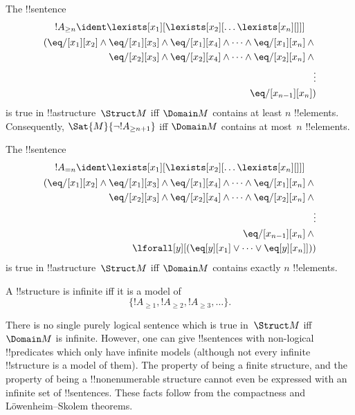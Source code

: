 \begin{prop}
The !!{sentence}
\begin{multline*}
  !A_{\ge n} \ident \lexists[x_1][\lexists[x_2][\dots\lexists[x_n][{}]]]\\
  \begin{aligned}
  (\eq/[x_1][x_2] \land {}
  \eq/[x_1][x_3] \land \eq/[x_1][x_4] \land \dots \land \eq/[x_1][x_n] \land {}\\
\eq/[x_2][x_3] \land \eq/[x_2][x_4] \land \dots \land {} \eq/[x_2][x_n] \land {} \\
\vdots\\
\eq/[x_{n-1}][x_n])
\end{aligned}
\end{multline*}
is true in !!a{structure}~$\Struct M$ iff $\Domain M$ contains at
least $n$ !!{element}s. Consequently, $\Sat{M}{\lnot !A_{\ge n+1}}$ iff
$\Domain M$ contains at most~$n$ !!{element}s.

\end{prop}

\begin{prop}
The !!{sentence}
\begin{multline*}
!A_{= n} \ident \lexists[x_1][\lexists[x_2][\dots\lexists[x_n][{}]]] \\
\begin{aligned}
  (\eq/[x_1][x_2] \land {}
  \eq/[x_1][x_3] \land \eq/[x_1][x_4] \land \dots \land \eq/[x_1][x_n] \land {}\\
\eq/[x_2][x_3] \land \eq/[x_2][x_4] \land \dots \land {} \eq/[x_2][x_n] \land {} \\
\vdots\\
\eq/[x_{n-1}][x_n] \land {} \\
\lforall[y][(\eq[y][x_1] \lor \dots \lor \eq[y][x_n]]))
\end{aligned}
\end{multline*}
is true in !!a{structure}~$\Struct M$ iff $\Domain M$ contains
exactly $n$ !!{element}s.
\end{prop}

\begin{prop}
A !!{structure} is infinite iff it is a model of
\[
\{!A_{\ge 1}, !A_{\ge 2}, !A_{\ge 3}, \dots \}.
\]
\end{prop}

There is no single purely logical sentence which is true in~$\Struct
M$ iff $\Domain M$ is infinite.  However, one can give !!{sentence}s with
non-logical !!{predicate}s which only have infinite models (although
not every infinite !!{structure} is a model of them).  The property of
being a finite structure, and the property of being a
!!{nonenumerable} structure cannot even be expressed with an infinite
set of !!{sentence}s.  These facts follow from the compactness and
L\"owenheim--Skolem theorems.



\OLEndChapterHook





